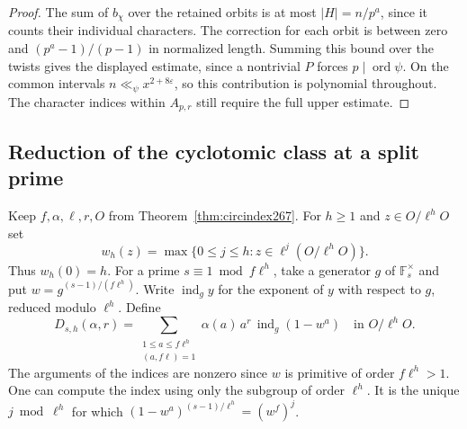 \documentclass[a4paper,11pt]{article}
\theoremstyle{definition}
\theoremstyle{remark}
\numberwithin{equation}{section}
\begin{document}
\begin{proof}
The sum of \(b_\chi\) over the retained orbits is at most
\(|H|=n/p^a\), since it counts their individual characters.
The correction for each orbit is between zero and
\((p^a-1)/(p-1)\) in normalized length. Summing this bound
over the twists gives the displayed estimate, since a nontrivial
\(P\) forces \(p\mid\operatorname{ord}\psi\). On the common
intervals \(n\ll_\psi x^{2+8\varepsilon}\), so this contribution
is polynomial throughout. The character indices within
\(A_{p,r}\) still require the full upper estimate.
\end{proof}

\subsection{Reduction of the cyclotomic class at a split prime}\label{nav:IV-40}
Keep \(f,\alpha,\ell,r,O\) from Theorem~\ref{thm:circindex267}.
For \(h\ge1\) and \(z\in O/\ell^hO\) set
\[
 w_h(z)=\max\{0\le j\le h:z\in\ell^j(O/\ell^hO)\}.
\]
Thus \(w_h(0)=h\). For a prime \(s\equiv1\bmod f\ell^h\),
take a generator \(g\) of \(\mathbb F_s^\times\) and put
\(w=g^{(s-1)/(f\ell^h)}\). Write \(\operatorname{ind}_g y\)
for the exponent of \(y\) with respect to \(g\), reduced
modulo \(\ell^h\). Define
\[
 D_{s,h}(\alpha,r)=
 \sum_{\substack{1\le a\le f\ell^h\\(a,f\ell)=1}}
       \alpha(a)\,a^r\,\operatorname{ind}_g(1-w^a)
       \quad\text{in }O/\ell^hO .
\]
The arguments of the indices are nonzero since \(w\) is
primitive of order \(f\ell^h>1\). One can compute the index
using only the subgroup of order \(\ell^h\). It is the unique
\(j\bmod\ell^h\) for which
\((1-w^a)^{(s-1)/\ell^h}=(w^f)^j\).
\end{document}
